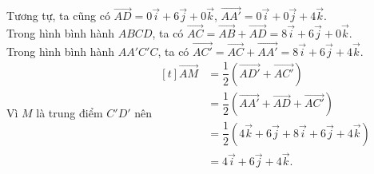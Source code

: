 \begin{bt}
{					Tương tự, ta cũng có $\overrightarrow{AD}=0\overrightarrow{i}+6\overrightarrow{j}+0\overrightarrow{k}$, $\overrightarrow{AA'}=0\overrightarrow{i}+0\overrightarrow{j}+4\overrightarrow{k}$. \\
					Trong hình bình hành $ABCD$, ta có $\overrightarrow{AC}=\overrightarrow{AB}+\overrightarrow{AD}=8\overrightarrow{i}+6\overrightarrow{j}+0\overrightarrow{k}$.\\
					Trong hình bình hành $AA'C'C$, ta có $\overrightarrow{AC'}=\overrightarrow{AC}+\overrightarrow{AA'}=8\overrightarrow{i}+6\overrightarrow{j}+4\overrightarrow{k}$.\\
					Vì $M$ là trung điểm $C'D'$ nên $\begin{aligned}[t]
						\overrightarrow{AM}	&=\dfrac{1}{2}\left(\overrightarrow{AD'}+\overrightarrow{AC'}\right) \\
						&=\dfrac{1}{2}\left(\overrightarrow{AA'}+\overrightarrow{AD}+\overrightarrow{AC'}\right) \\
						&=\dfrac{1}{2}\left(4\overrightarrow{k}+6\overrightarrow{j}+8\overrightarrow{i}+6\overrightarrow{j}+4\overrightarrow{k}\right)\\
						&=4\overrightarrow{i}+6\overrightarrow{j}+4\overrightarrow{k}.
					\end{aligned}$
				}
			\end{bt}

